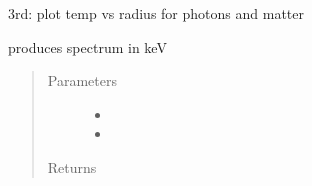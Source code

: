 \documentclass[letterpaper,10pt,english]{sphinxmanual}
\begin{document}
3rd: plot temp vs radius for photons and matter

\begin{fulllineitems}
\label{\detokenize{mcrat_movie:mcrat_movie.calc_spectrum}}
produces spectrum in keV
\begin{quote}\begin{description}
\item[{Parameters}] \leavevmode\begin{itemize}
\item {} 
 \textendash{} 

\item {} 
 \textendash{} 

\end{itemize}

\item[{Returns}] \leavevmode


\end{description}\end{quote}

\end{fulllineitems}

\end{document}
